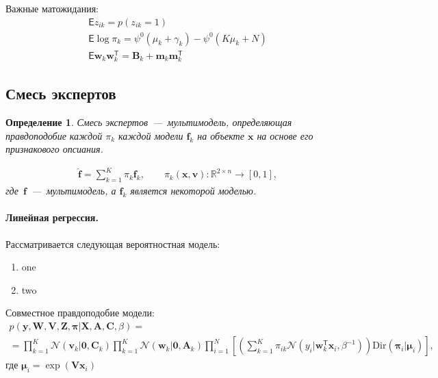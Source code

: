 \documentclass[12pt, twoside]{article}
\newtheorem{definition}{Определение}[section]
\numberwithin{equation}{section}
\begin{document}
Важные матожидания:
\begin{equation}
\label{eq:st:24}
\begin{aligned}
\mathsf{E}z_{ik} = p(z_{ik} = 1) \\
\mathsf{E}\log\pi_{k} = \psi^{0}(\mu_k + \gamma_k) - \psi^{0}(K\mu_k + N) \\
\mathsf{E}\textbf{w}_k\textbf{w}_k^{\mathsf{T}} = \textbf{B}_k + \textbf{m}_k\textbf{m}_k^{\mathsf{T}}
\end{aligned}
\end{equation}

\subsection{Смесь экспертов}
\begin{definition}
Смесь экспертов~---~мультимодель, определяющая правдоподобие каждой $\pi_k$ каждой модели $\textbf{f}_k$ на объекте $\textbf{x}$ на основе его признакового опсиания.

\begin{equation}
\label{eq:st:27}
\begin{aligned}
\hat{\textbf{f}} = \sum_{k=1}^{K}\pi_{k}\textbf{f}_k, \qquad \pi_{k}\left(\textbf{x}, \textbf{v}\right):\mathbb{R}^{2\times n} \to [0, 1],
\end{aligned}
\end{equation}
где~$\textbf{f}$~---~мультимодель, а $\textbf{f}_k$ является некоторой моделью.
\end{definition}

\paragraph{Линейная регрессия.} Рассматривается следующая вероятностная модель:
\begin{enumerate}
	\item one
	\item two
\end{enumerate}

Совместное правдоподобие модели:
\begin{equation}
\label{eq:st:28}
\begin{aligned}
p\left(\textbf{y}, \textbf{W}, \textbf{V}, \textbf{Z}, \bm{\pi}|\textbf{X}, \textbf{A}, \textbf{C}, \beta\right) = \\
= \prod_{k=1}^{K}\mathcal{N}\left(\textbf{v}_k|\textbf{0}, \textbf{C}_k\right)\prod_{k=1}^{K}\mathcal{N}\left(\textbf{w}_k|\textbf{0}, \textbf{A}_k\right)\prod_{i=1}^{N}\left[\left(\sum_{k=1}^{K}\pi_{ik}\mathcal{N}\left(y_i|\textbf{w}_{k}^{\mathsf{T}}\textbf{x}_i, \beta^{-1}\right)\right)\text{Dir}\left(\bm{\pi}_i|\bm{\mu}_i\right)\right],
\end{aligned}
\end{equation}
где $\bm{\mu}_i = \exp\left(\textbf{V}\textbf{x}_i\right)$
\end{document}
